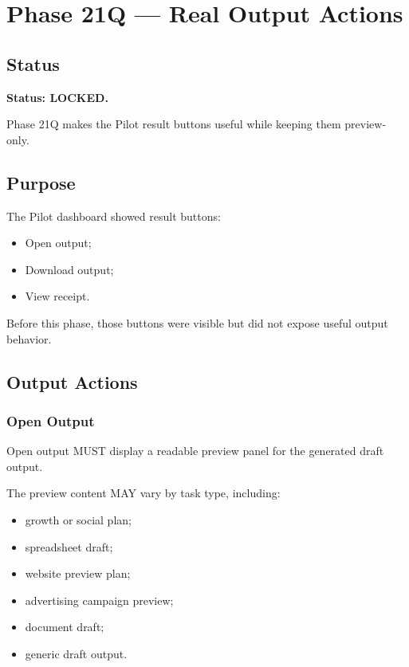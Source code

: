 \section{Phase 21Q --- Real Output Actions}
\label{sec:aion-phase21q-real-output-actions}

\subsection{Status}

\textbf{Status: LOCKED.}

Phase 21Q makes the Pilot result buttons useful while keeping them preview-only.

\subsection{Purpose}

The Pilot dashboard showed result buttons:

\begin{itemize}
  \item Open output;
  \item Download output;
  \item View receipt.
\end{itemize}

Before this phase, those buttons were visible but did not expose useful output behavior.

\subsection{Output Actions}

\subsubsection{Open Output}

Open output MUST display a readable preview panel for the generated draft output.

The preview content MAY vary by task type, including:

\begin{itemize}
  \item growth or social plan;
  \item spreadsheet draft;
  \item website preview plan;
  \item advertising campaign preview;
  \item document draft;
  \item generic draft output.
\end{itemize}

